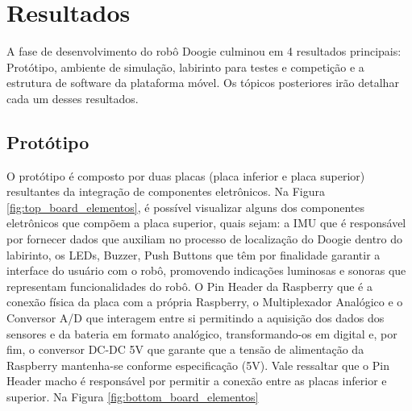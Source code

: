 \chapter{Resultados}
\label{chap:resultados}
A fase de desenvolvimento do robô Doogie culminou em 4 resultados principais: Protótipo, ambiente de simulação, labirinto para testes e competição e a estrutura de software da plataforma móvel. Os tópicos posteriores irão detalhar cada um desses resultados. 

\section{Protótipo}
\label{sec:resultado_prototipo}
O protótipo é composto por duas placas (placa inferior e placa superior) resultantes da integração de componentes eletrônicos. Na Figura \ref{fig:top_board_elementos}, é possível visualizar alguns dos componentes eletrônicos que compõem a placa superior, quais sejam: a IMU que é responsável por fornecer dados que auxiliam no processo de localização do Doogie dentro do labirinto, os LEDs, Buzzer, Push Buttons que têm por finalidade garantir a interface do usuário com o robô, promovendo indicações luminosas e sonoras que representam funcionalidades do robô. O Pin Header da Raspberry que é a conexão física da placa com a própria Raspberry, o Multiplexador Analógico e o Conversor A/D que interagem entre si permitindo a aquisição dos dados dos sensores e da bateria em formato analógico, transformando-os em digital e, por fim, o conversor DC-DC 5V que garante que a tensão de alimentação da Raspberry mantenha-se conforme especificação (5V). Vale ressaltar que o Pin Header macho é responsável por permitir a conexão entre as placas inferior e superior. Na Figura \ref{fig:bottom_board_elementos}  

